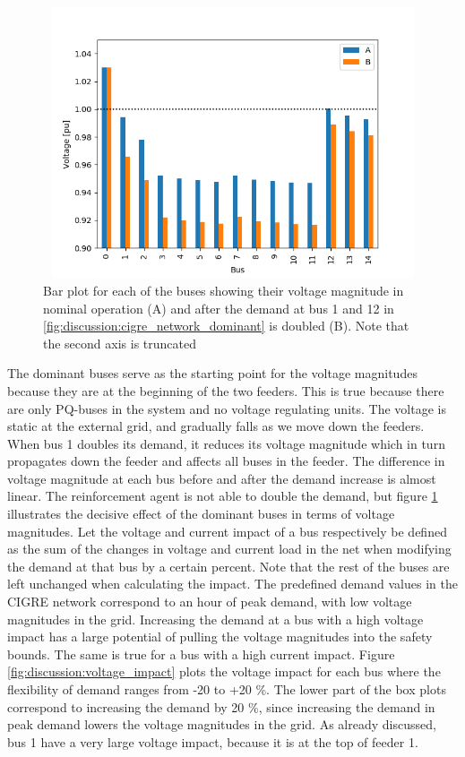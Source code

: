 \documentclass[class=book, crop=false]{standalone}
\begin{document}
\begin{figure}[h]
    \center
\includegraphics[height=8cm, width=12cm]{figures/double_large_load.png}
    \caption[size = 9]{Bar plot for each of the buses showing their voltage magnitude in nominal operation (A) and after the demand at bus 1 and 12 in \ref{fig:discussion:cigre_network_dominant} is doubled (B). Note that the second axis is truncated}
    \label{fig:discussion:double_large_load}
\end{figure}
The dominant buses serve as the starting point for the voltage magnitudes because they are at the beginning of the two feeders. This is true because there are only PQ-buses in the system and no voltage regulating units. The voltage is static at the external grid, and gradually falls as we move down the feeders. When bus 1 doubles its demand, it reduces its voltage magnitude which in turn propagates down the feeder and affects all buses in the feeder. The difference in voltage magnitude at each bus before and after the demand increase is almost linear. The reinforcement agent is not able to double the demand, but figure \ref{fig:discussion:double_large_load} illustrates the decisive effect of the dominant buses in terms of voltage magnitudes. Let the voltage and current impact of a bus respectively be defined as the sum of the changes in voltage and current load in the net when modifying the demand at that bus by a certain percent. Note that the rest of the buses are left unchanged when calculating the impact. The predefined demand values in the CIGRE network correspond to an hour of peak demand, with low voltage magnitudes in the grid. Increasing the demand at a bus with a high voltage impact has a large potential of pulling the voltage magnitudes into the safety bounds. The same is true for a bus with a high current impact. Figure \ref{fig:discussion:voltage_impact} plots the voltage impact for each bus where the flexibility of demand ranges from -20 to +20 \%. The lower part of the box plots correspond to increasing the demand by 20 \%, since increasing the demand in peak demand lowers the voltage magnitudes in the grid. As already discussed, bus 1 have a very large voltage impact, because it is at the top of feeder 1. 
\end{document}
